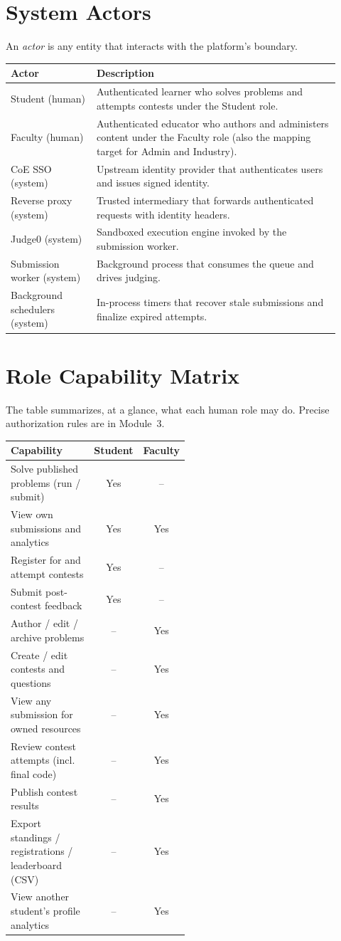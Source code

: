 \documentclass[12pt,a4paper,oneside]{report}
\begin{document}
\section{System Actors}
An \emph{actor} is any entity that interacts with the platform's boundary.

\begin{longtable}{@{}p{0.24\linewidth} p{0.68\linewidth}@{}}
\toprule
\textbf{Actor} & \textbf{Description}\\
\midrule
\endhead
Student (human) & Authenticated learner who solves problems and attempts contests under the Student role.\\
Faculty (human) & Authenticated educator who authors and administers content under the Faculty role (also the mapping target for Admin and Industry).\\
CoE SSO (system) & Upstream identity provider that authenticates users and issues signed identity.\\
Reverse proxy (system) & Trusted intermediary that forwards authenticated requests with identity headers.\\
Judge0 (system) & Sandboxed execution engine invoked by the submission worker.\\
Submission worker (system) & Background process that consumes the queue and drives judging.\\
Background schedulers (system) & In-process timers that recover stale submissions and finalize expired attempts.\\
\bottomrule
\end{longtable}

\section{Role Capability Matrix}
The table summarizes, at a glance, what each human role may do. Precise
authorization rules are in Module~3.

\begin{longtable}{@{}p{0.50\linewidth} c c@{}}
\toprule
\textbf{Capability} & \textbf{Student} & \textbf{Faculty}\\
\midrule
\endhead
Solve published problems (run / submit) & Yes & --\\
View own submissions and analytics & Yes & Yes\\
Register for and attempt contests & Yes & --\\
Submit post-contest feedback & Yes & --\\
Author / edit / archive problems & -- & Yes\\
Create / edit contests and questions & -- & Yes\\
View any submission for owned resources & -- & Yes\\
Review contest attempts (incl. final code) & -- & Yes\\
Publish contest results & -- & Yes\\
Export standings / registrations / leaderboard (CSV) & -- & Yes\\
View another student's profile analytics & -- & Yes\\
\bottomrule
\end{longtable}
\end{document}
